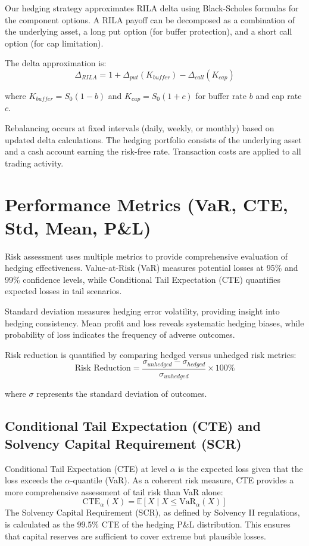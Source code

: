 \documentclass[12pt,a4paper]{report}
\begin{document}
Our hedging strategy approximates RILA delta using Black-Scholes formulas for the component options. A RILA payoff can be decomposed as a combination of the underlying asset, a long put option (for buffer protection), and a short call option (for cap limitation).

The delta approximation is:
\begin{equation}
\Delta_{RILA} = 1 + \Delta_{put}(K_{buffer}) - \Delta_{call}(K_{cap})
\end{equation}

where $K_{buffer} = S_0(1-b)$ and $K_{cap} = S_0(1+c)$ for buffer rate $b$ and cap rate $c$.

Rebalancing occurs at fixed intervals (daily, weekly, or monthly) based on updated delta calculations. The hedging portfolio consists of the underlying asset and a cash account earning the risk-free rate. Transaction costs are applied to all trading activity.

\section{Performance Metrics (VaR, CTE, Std, Mean, P\&L)}

Risk assessment uses multiple metrics to provide comprehensive evaluation of hedging effectiveness. Value-at-Risk (VaR) measures potential losses at 95\% and 99\% confidence levels, while Conditional Tail Expectation (CTE) quantifies expected losses in tail scenarios.

Standard deviation measures hedging error volatility, providing insight into hedging consistency. Mean profit and loss reveals systematic hedging biases, while probability of loss indicates the frequency of adverse outcomes.

Risk reduction is quantified by comparing hedged versus unhedged risk metrics:
\begin{equation}
\text{Risk Reduction} = \frac{\sigma_{unhedged} - \sigma_{hedged}}{\sigma_{unhedged}} \times 100\%
\end{equation}

where $\sigma$ represents the standard deviation of outcomes.

\subsection{Conditional Tail Expectation (CTE) and Solvency Capital Requirement (SCR)}
Conditional Tail Expectation (CTE) at level $\alpha$ is the expected loss given that the loss exceeds the $\alpha$-quantile (VaR). As a coherent risk measure, CTE provides a more comprehensive assessment of tail risk than VaR alone:
\[
\mathrm{CTE}_\alpha(X) = \mathbb{E}[X \mid X \leq \mathrm{VaR}_\alpha(X)]
\]
The Solvency Capital Requirement (SCR), as defined by Solvency II regulations, is calculated as the 99.5\% CTE of the hedging P\&L distribution. This ensures that capital reserves are sufficient to cover extreme but plausible losses.
\end{document}
